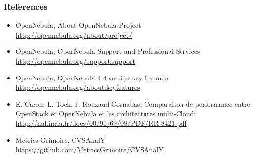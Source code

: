 \begin{frame}
\frametitle{References}


\begin{itemize}
\item OpenNebula, About OpenNebula Project
\url{http://opennebula.org/about/project/}
\item OpenNebula, OpenNebula Support and Professional Services
\url{http://opennebula.org/support:support}
\item OpenNebula, OpenNebula 4.4 version key features
\url{http://opennebula.org/about:keyfeatures}
\item E. Caron, L. Toch, J. Rouzaud-Cornabas, Comparaison de performance entre OpenStack et OpenNebula et les architectures multi-Cloud:\linebreak
\url{http://hal.inria.fr/docs/00/91/69/08/PDF/RR-8421.pdf}
\item Metrics-Grimoire, CVSAnalY
\url{https://github.com/MetricsGrimoire/CVSAnalY}
\end{itemize}

\end{frame}
